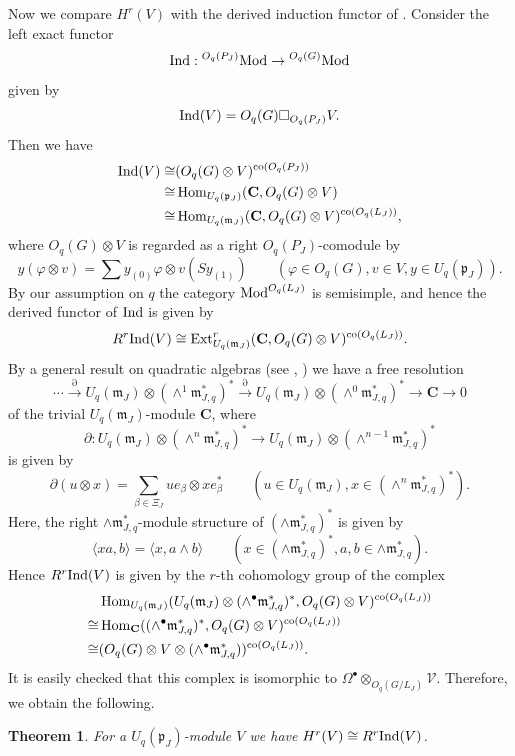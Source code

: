 \documentclass[a4paper, 12pt, leqno]{amsart}
\newtheorem{theorem}[lemma]{{\sc Theorem}}
\theoremstyle{definition}
\numberwithin{equation}{section}
\def\Gm{{\mathfrak{m}}}
\def\Gp{{\mathfrak{p}}}
\def\BC{{\mathbf{C}}}
\def\CV{{\mathcal V}}
\def\co{\mathop{\rm co}\nolimits}
\def\deru{\partial}
\def\Ext{{\mathop{\rm Ext}\nolimits}}
\def\Hom{\mathop{\rm Hom}\nolimits}
\def\Ind{{\mathop{\rm Ind}\nolimits}}
\def\Mod{\mathop{\rm Mod}\nolimits}
\def\m{\Gm_{J,q}}
\def\F{O_q(G/L_J)}
\begin{document}
Now we compare $H^r(V)$ with the derived induction functor of \cite{APW}.
Consider the  left exact functor 
\[
\Ind:{}^{O_q(P_J)}\!\Mod\to {}^{O_q(G)}\!\Mod
\]
given by
\[
\Ind(V)=O_q(G)\Box_{O_q(P_J)}V.
\]
Then we have
\begin{align*}
\Ind(V)\cong&(O_q(G)\otimes V)^{\co(O_q(P_J))}
\\
\cong&
\Hom_{U_q(\Gp_J)}(\BC,O_q(G)\otimes V)
\\
\cong&
\Hom_{U_q(\Gm_J)}(\BC,O_q(G)\otimes V)^{\co(O_q(L_J))},
\end{align*}
where $O_q(G)\otimes V$ is regarded as a right $O_q(P_J)$-comodule by
\[
y(\varphi\otimes v)=\sum y_{(0)}\varphi\otimes v(Sy_{(1)})
\qquad (\varphi\in O_q(G), v\in V, y\in U_q(\Gp_J)).
\]
By our assumption on $q$ the category $\Mod^{O_q(L_J)}$ is semisimple, and hence the derived functor of $\Ind$ is given by
\[
R^r\Ind(V)\cong\Ext^r_{U_q(\Gm_J)}(\BC,O_q(G)\otimes V)^{\co(O_q(L_J))}.
\]
By a general result on quadratic algebras (see \cite{P}, \cite{PP}) we have a free resolution 
\[
\cdots
\xrightarrow{\deru}
U_q(\Gm_J)\otimes(\wedge^1\m^*)^*
\xrightarrow{\deru}
U_q(\Gm_J)\otimes(\wedge^0\m^*)^*
\to
\BC\to 0
\]
of the trivial $U_q(\Gm_J)$-module $\BC$,
where
\[
\deru:U_q(\Gm_J)\otimes(\wedge^n\m^*)^*
\to
U_q(\Gm_J)\otimes(\wedge^{n-1}\m^*)^*
\]
is given by 
\[
\deru(u\otimes x)=\sum_{\beta\in\Xi_J}ue_\beta\otimes xe^*_\beta
\qquad(u\in U_q(\Gm_J), x\in(\wedge^n\m^*)^*).
\]
Here, the right $\wedge\m^*$-module structure of $(\wedge\m^*)^*$ is given by
\[
\langle xa,b\rangle=\langle x, a\wedge b\rangle
\qquad(x\in (\wedge\m^*)^*, a, b\in \wedge\m^*).
\]
Hence $R^r\Ind(V)$ is given by the $r$-th cohomology group of the complex
\begin{align*}
&\Hom_{U_q(\Gm_J)}(U_q(\Gm_J)\otimes(\wedge^\bullet\m^*)^*,O_q(G)\otimes V)^{\co(O_q(L_J))}
\\
\cong&
\Hom_{\BC}((\wedge^\bullet\m^*)^*,O_q(G)\otimes V)^{\co(O_q(L_J))}
\\
\cong&
(O_q(G)\otimes V\otimes(\wedge^\bullet\m^*))^{\co(O_q(L_J))}.
\end{align*}
It is easily checked that this complex is isomorphic to $\Omega^\bullet\otimes_{\F}\CV$.
Therefore, we obtain the following.
\begin{theorem}
For a $U_q(\Gp_J)$-module $V$ we have $H^r(V)\cong R^r\Ind(V)$.
\end{theorem}
\end{document}
